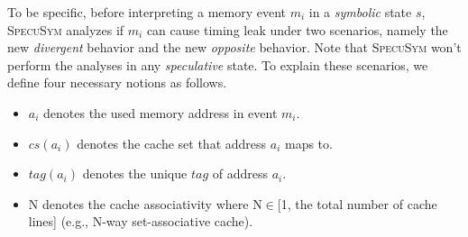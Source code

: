 \documentclass[sigconf,screen]{acmart}
\newcommand{\SpecuSym}{\textsc{SpecuSym} }
\begin{document}
To be specific, before interpreting a memory event $m_i$ in a \textit{symbolic} 
state $s$, \SpecuSym analyzes if $\mathit{m_i}$ can cause timing leak under two 
scenarios, namely the new \textit{divergent} behavior and the new \textit{opposite} 
behavior. Note that \SpecuSym won't perform the analyses in any \textit{speculative} 
state. To explain these scenarios, we define four necessary notions as follows.
%
%
\begin{itemize}
  \item $\mathit{a_i}$ denotes the used memory address in event $\mathit{m_i}$.
  \item $\mathit{cs(a_i)}$ denotes the cache set that address $\mathit{a_i}$ maps to.
  \item $\mathit{tag(a_i)}$ denotes the unique $\mathit{tag}$ of address $\mathit{a_i}$.
  \item {N} denotes the cache associativity where N$\in$[1, the total number of cache lines] (e.g., N-way set-associative cache). 
\end{itemize}
%
%
\end{document}
